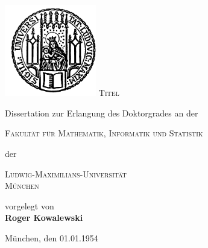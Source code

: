 
\begin{titlepage}
	\begin{center}
        \includegraphics[width=0.3\textwidth]{Misc/lmu_siegel}
        \vskip 1cm
		\textsc{\huge Titel}
                \vskip 1cm
                \begin{large}
                  Dissertation zur Erlangung des Doktorgrades an der\\[0.50cm]
                  \begin{Large}
                    \textsc{Fakultät für Mathematik, Informatik und Statistik}\\[0.50cm]
                  \end{Large}
                  der\\[0.50cm]
                  \begin{Large}
                    \textsc{Ludwig-Maximilians-Universität\\München}\par
                  \end{Large}
                \end{large}
		\vfill
                {\large vorgelegt von}\\[0.5cm]
                {\LARGE \bfseries Roger Kowalewski}
    \vskip 1cm
    \begin{small}
        München, den 01.01.1954
    \end{small}
	\end{center}
\end{titlepage}


